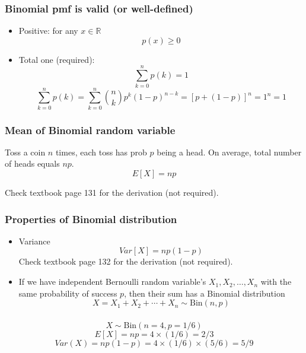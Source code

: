 \documentclass[slidestop,compress,mathserif]{beamer}
\begin{document}
\begin{frame}\frametitle{Binomial pmf is valid (or well-defined)} %

\begin{itemize}
\item Positive: for any $x \in \mathbb{R}$
\[p(x) \geq 0\]
\item Total one ({\color{red}required}):
 \[\sum_{k = 0}^n p(k) = 1\]
\pause
{}
$$\sum_{k = 0}^n p(k) = \sum_{k = 0}^n {n \choose k} p^k(1-p)^{n-k} = [p+(1-p)]^n = 1^n = 1$$

\end{itemize}

\end{frame}
\begin{frame}\frametitle{Mean of Binomial random variable}

Toss a coin $n$ times, each toss has prob $p$ being a head. On average,
total number of heads equals $np$.\\
\pause
\[E[X] = np \]

Check textbook page 131 for the derivation ({\color{red}not required}).

\end{frame}

\begin{frame}\frametitle{Properties of Binomial distribution}

\begin{itemize}
\item Variance
\[Var[X] = np(1-p) \]
Check textbook page 132 for the derivation ({\color{red}not required}).

\pause
\vfill
\item If we have independent Bernoulli random variable's $X_1, X_2, \ldots, X_n$ with the same probability of success $p$, then
their sum has a Binomial distribution
\[
X = X_1 + X_2 + \cdots + X_n \sim \text{Bin}(n, p)
\]


\end{itemize}

\end{frame}


\begin{frame}
\frametitle{}


\pause
\[ X \sim \text{Bin}(n = 4, p = 1/6)\]
\pause
\[E[X] = np = 4 \times (1/6) = 2/3\]
\[Var(X) = np(1-p) = 4 \times (1/6) \times (5/6) = 5/9\]


\end{frame}
\end{document}
